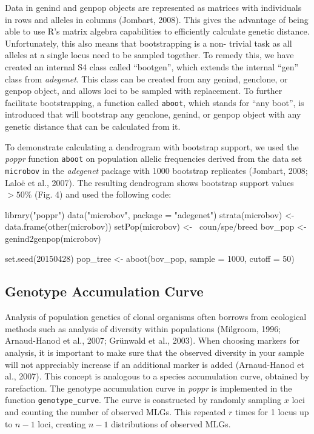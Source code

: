 \documentclass{frontiersSCNS} %
\newenvironment{CodeChunk}{}{}
\begin{document}
Data in genind and genpop objects are represented as matrices with
individuals in rows and alleles in columns (Jombart, 2008). This gives
the advantage of being able to use R's matrix algebra capabilities to
efficiently calculate genetic distance. Unfortunately, this also means
that bootstrapping is a non- trivial task as all alleles at a single
locus need to be sampled together. To remedy this, we have created an
internal S4 class called ``bootgen'', which extends the internal ``gen''
class from \emph{adegenet}. This class can be created from any genind,
genclone, or genpop object, and allows loci to be sampled with
replacement. To further facilitate bootstrapping, a function called
\texttt{aboot}, which stands for ``any boot'', is introduced that will
bootstrap any genclone, genind, or genpop object with any genetic
distance that can be calculated from it.

To demonstrate calculating a dendrogram with bootstrap support, we used
the \emph{poppr} function \texttt{aboot} on population allelic
frequencies derived from the data set \texttt{microbov} in the
\emph{adegenet} package with 1000 bootstrap replicates (Jombart, 2008;
Lalo{\"{e}} et al., 2007). The resulting dendrogram shows bootstrap support
values \(>50\%\) (Fig. 4) and used the following code:

\begin{CodeChunk}
\begin{CodeInput}
library("poppr")
data("microbov", package = "adegenet") 
strata(microbov) <- data.frame(other(microbov)) 
setPop(microbov) <- ~coun/spe/breed 
bov_pop <- genind2genpop(microbov) 

set.seed(20150428)
pop_tree <- aboot(bov_pop, sample = 1000, cutoff = 50)
\end{CodeInput}
\end{CodeChunk}

\subsection*{Genotype Accumulation
Curve}\label{genotype-accumulation-curve}

Analysis of population genetics of clonal organisms often borrows from
ecological methods such as analysis of diversity within populations
(Milgroom, 1996; Arnaud-Hanod et al., 2007; Gr\"{u}nwald et al., 2003). When
choosing markers for analysis, it is important to make sure that the
observed diversity in your sample will not appreciably increase if an
additional marker is added (Arnaud-Hanod et al., 2007). This concept is
analogous to a species accumulation curve, obtained by rarefaction. The
genotype accumulation curve in \emph{poppr} is implemented in the
function \texttt{genotype\_curve}. The curve is constructed by randomly
sampling \(x\) loci and counting the number of observed MLGs. This
repeated \(r\) times for 1 locus up to \(n-1\) loci, creating \(n-1\)
distributions of observed MLGs.
\end{document}
